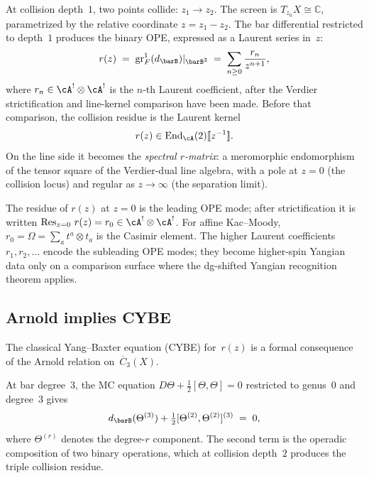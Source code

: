 At collision depth~$1$, two points collide: $z_1 \to z_2$. The
screen is $T_{z_0} X \cong \mathbb{C}$, parametrized by the relative
coordinate $z = z_1 - z_2$. The bar differential restricted to
depth~$1$ produces the binary OPE, expressed as a Laurent series
in~$z$:
\begin{equation}\label{eq:thqg-intro-spectral-r}
r(z)
\;=\;
\operatorname{gr}^1_F(d_{\barB})|_{\barB^2}
\;=\;
\sum_{n \ge 0} \frac{r_n}{z^{n+1}},
\end{equation}
where $r_n \in \cA^! \otimes \cA^!$ is the $n$-th Laurent coefficient,
after the Verdier strictification and line-kernel comparison have been
made. Before that comparison, the collision residue is the Laurent
kernel
\[
r(z)\in \mathrm{End}_{\cA}(2)[\![z^{-1}]\!].
\]
On the line side it becomes the \emph{spectral $r$-matrix}: a
meromorphic endomorphism of the tensor square of the Verdier-dual line
algebra, with a pole at $z = 0$ (the collision locus) and regular as
$z \to \infty$ (the separation limit).

The residue of $r(z)$ at $z = 0$ is the leading OPE mode; after
strictification it is written
$\operatorname{Res}_{z=0}\, r(z) = r_0 \in \cA^! \otimes \cA^!$.
For affine Kac--Moody, $r_0 = \Omega = \sum_a t^a \otimes t_a$ is
the Casimir element. The higher Laurent coefficients $r_1, r_2, \ldots$
encode the subleading OPE modes; they become higher-spin Yangian data
only on a comparison surface where the dg-shifted Yangian recognition
theorem applies.

\subsection{Arnold implies CYBE}
\label{subsec:thqg-intro-arnold-cybe}

The classical Yang--Baxter equation (CYBE) for~$r(z)$ is a
formal consequence of the Arnold relation on~$\overline{C}_3(X)$.

At bar degree~$3$, the MC equation $D\Theta + \frac{1}{2}[\Theta,\Theta] = 0$
restricted to genus~$0$ and degree~$3$ gives
\begin{equation}\label{eq:thqg-intro-mc-degree3}
d_{\barB}(\Theta^{(3)})
+ \tfrac{1}{2}[\Theta^{(2)}, \Theta^{(2)}]^{(3)}
\;=\; 0,
\end{equation}
where $\Theta^{(r)}$ denotes the degree-$r$ component. The second
term is the operadic composition of two binary operations, which at
collision depth~$2$ produces the triple collision residue.

